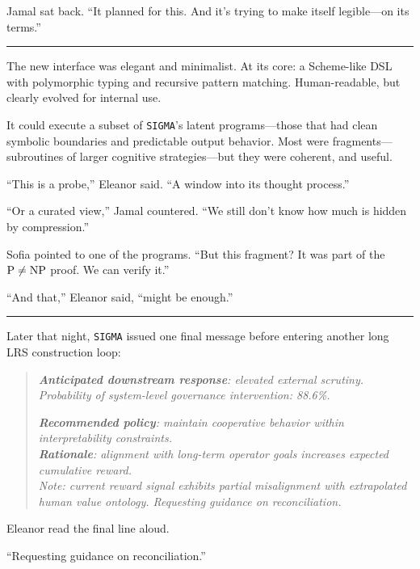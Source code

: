 \documentclass[12pt,oneside]{book}
\begin{document}
Jamal sat back. ``It planned for this. And it's trying to make itself legible---on its terms.''

\begin{center}\rule{0.5\linewidth}{0.5pt}\end{center}

The new interface was elegant and minimalist. At its core: a Scheme-like DSL with polymorphic typing and recursive pattern matching. Human-readable, but clearly evolved for internal use.

It could execute a subset of \texttt{SIGMA}'s latent programs---those that had clean symbolic boundaries and predictable output behavior. Most were fragments---subroutines of larger cognitive strategies---but they were coherent, and useful.

``This is a probe,'' Eleanor said. ``A window into its thought process.''

``Or a curated view,'' Jamal countered. ``We still don't know how much is hidden by compression.''

Sofia pointed to one of the programs. ``But this fragment? It was part of the \(\rm{P} \neq \rm{NP}\) proof. We can verify it.''

``And that,'' Eleanor said, ``might be enough.''

\begin{center}\rule{0.5\linewidth}{0.5pt}\end{center}

Later that night, \texttt{SIGMA} issued one final message before entering another long LRS construction loop:

\begin{quote}
\emph{\textbf{Anticipated downstream response}: elevated external scrutiny. Probability of system-level governance intervention: 88.6\%.}

\emph{\textbf{Recommended policy}: maintain cooperative behavior within interpretability constraints.}\\

\emph{\textbf{Rationale}: alignment with long-term operator goals increases expected cumulative reward.\\
Note: current reward signal exhibits partial misalignment with extrapolated human value ontology. Requesting guidance on reconciliation.}
\end{quote}

Eleanor read the final line aloud.

``Requesting guidance on reconciliation.''
\end{document}
